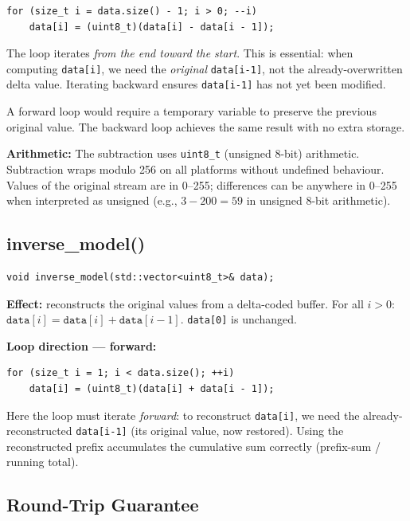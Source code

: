\begin{lstlisting}[style=cpp]
for (size_t i = data.size() - 1; i > 0; --i)
    data[i] = (uint8_t)(data[i] - data[i - 1]);
\end{lstlisting}

The loop iterates \emph{from the end toward the start}.
This is essential: when computing \texttt{data[i]}, we need the \emph{original}
\texttt{data[i-1]}, not the already-overwritten delta value.
Iterating backward ensures \texttt{data[i-1]} has not yet been modified.

A forward loop would require a temporary variable to preserve the previous original value.
The backward loop achieves the same result with no extra storage.

\textbf{Arithmetic:}
The subtraction uses \texttt{uint8\_t} (unsigned 8-bit) arithmetic.
Subtraction wraps modulo 256 on all platforms without undefined behaviour.
Values of the original stream are in 0--255; differences can be anywhere in 0--255
when interpreted as unsigned (e.g., $3 - 200 = 59$ in unsigned 8-bit arithmetic).

\subsection{inverse\_model()}

\begin{lstlisting}[style=cpp]
void inverse_model(std::vector<uint8_t>& data);
\end{lstlisting}

\textbf{Effect:} reconstructs the original values from a delta-coded buffer.
For all $i > 0$: $\mathtt{data}[i] = \mathtt{data}[i] + \mathtt{data}[i-1]$.
\texttt{data[0]} is unchanged.

\textbf{Loop direction --- forward:}

\begin{lstlisting}[style=cpp]
for (size_t i = 1; i < data.size(); ++i)
    data[i] = (uint8_t)(data[i] + data[i - 1]);
\end{lstlisting}

Here the loop must iterate \emph{forward}: to reconstruct \texttt{data[i]}, we need
the already-reconstructed \texttt{data[i-1]} (its original value, now restored).
Using the reconstructed prefix accumulates the cumulative sum correctly
(prefix-sum / running total).

\subsection{Round-Trip Guarantee}

